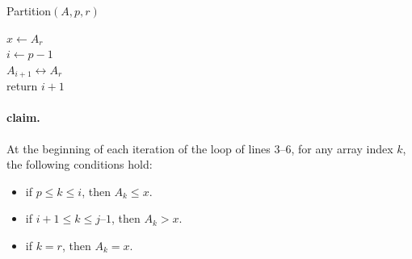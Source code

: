 
\begin{algbox}{Partition$(A, p, r)$}
  \begin{algorithm}[H]
    $ x \leftarrow A_{r} $ \\
    $ i \leftarrow p - 1 $ \\
   $ A_{i+1} \leftrightarrow A_{r} $\\
   return $ i+1$
  \end{algorithm}
\end{algbox}

\paragraph{claim.} At the beginning of each iteration of the loop of lines 3–6, for any array index $k$, the following conditions hold:
\begin{itemize}
  \item  if $p \le k \le i$, then $A_{k} \le x$.
  \item  if $i + 1 \le k \le j – 1$, then $A_{k} > x$.
  \item  if $k = r$, then $A_{k} = x$.
\end{itemize}
